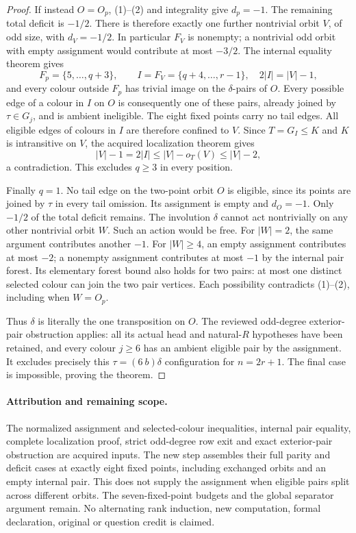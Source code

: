 \documentclass[11pt,a4paper]{article}
\begin{document}
\begin{proof}
If instead $O=O_p$, (1)--(2) and integrality give
$d_p=-1$. The remaining total deficit is $-1/2$.
There is therefore exactly one further nontrivial orbit
$V$, of odd size, with $d_V=-1/2$. In particular $F_V$
is nonempty; a nontrivial odd orbit with empty assignment
would contribute at most $-3/2$. The internal equality
theorem gives
\[
 F_p=\{5,\ldots,q+3\},\qquad
 I=F_V=\{q+4,\ldots,r-1\},\quad 2|I|=|V|-1,
\]
and every colour outside $F_p$ has trivial image on the
$\delta$-pairs of $O$. Every possible edge of a colour
in $I$ on $O$ is consequently one of these pairs, already
joined by $\tau\in G_j$, and is ambient ineligible.
The eight fixed points carry no tail edges. All eligible
edges of colours in $I$ are therefore confined to $V$.
Since $T=G_I\le K$ and $K$ is intransitive on $V$, the
acquired localization theorem gives
\[
 |V|-1=2|I|\le |V|-o_T(V)\le |V|-2,
\]
a contradiction. This excludes $q\ge3$ in every position.

Finally $q=1$. No tail edge on the two-point orbit $O$
is eligible, since its points are joined by $\tau$ in
every tail omission. Its assignment is empty and
$d_O=-1$. Only $-1/2$ of the total deficit remains.
The involution $\delta$ cannot act nontrivially on any
other nontrivial orbit $W$. Such an action would be free.
For $|W|=2$, the same argument contributes another $-1$.
For $|W|\ge4$, an empty assignment contributes at most
$-2$; a nonempty assignment contributes at most $-1$
by the internal pair forest. Its elementary forest bound
also holds for two pairs: at most one distinct selected
colour can join the two pair vertices. Each possibility
contradicts (1)--(2), including when $W=O_p$.

Thus $\delta$ is literally the one transposition on $O$.
The reviewed odd-degree exterior-pair obstruction applies:
all its actual head and natural-$R$ hypotheses have been
retained, and every colour $j\ge6$ has an ambient eligible
pair by the assignment. It excludes precisely this
$\tau=(6\ b)\delta$ configuration for $n=2r+1$.
The final case is impossible, proving the theorem.
\end{proof}

\paragraph{Attribution and remaining scope.}
The normalized assignment and selected-colour inequalities,
internal pair equality, complete localization proof, strict
odd-degree row exit and exact exterior-pair obstruction are
acquired inputs. The new step assembles their full parity and
deficit cases at exactly eight fixed points, including exchanged
orbits and an empty internal pair. This does not supply the
assignment when eligible pairs split across different orbits.
The seven-fixed-point budgets and the global separator argument
remain. No alternating rank induction, new computation, formal
declaration, original or question credit is claimed.
\end{document}
